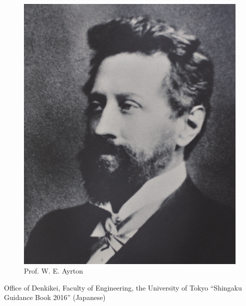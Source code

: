 \documentclass[a4paper]{article}
\begin{document}
\begin{figure}[htbp]
  \centering
  \includegraphics[height=45truemm]{ayrton.png}
  \caption{Prof. W. E. Ayrton}
  \label{fig:ayrton}
\end{figure}

\begin{thebibliography}{9}
 Office of Denkikei, Faculty of Engineering, the University of Tokyo ``Shingaku Guidance Book 2016'' (Japanese)
\end{thebibliography}
\end{document}
